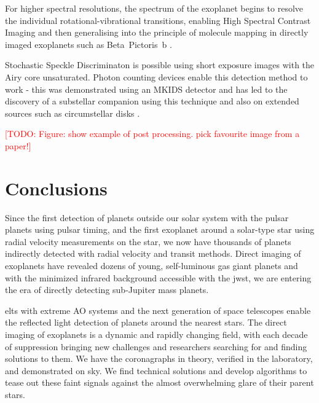 \documentclass[letterpaper]{ar-1col}
\newcommand{\todo}[1]{\textcolor{red}{[TODO: #1]}}
\begin{document}
For higher spectral resolutions, the spectrum of the exoplanet begins to resolve the individual rotational-vibrational transitions, enabling High Spectral Contrast Imaging \citep[including the detection of HD~209458b ][]{Snellen10} and then generalising into the principle of molecule mapping in directly imaged exoplanets such as Beta~Pictoris~b \citep{Hoeijmakers18}.

Stochastic Speckle Discriminaton \citep[SSD; ][]{Gladysz09} is possible using short exposure images with the Airy core unsaturated.
%
Photon counting devices enable this detection method to work - this was demonstrated using an MKIDS detector and has led to the discovery of a substellar companion using this technique \citep{Steiger21} and also on extended sources such as circumstellar disks \citep{Steiger22}.


\todo{Figure: show example of post processing. pick favourite image from a paper!}

\section{Conclusions}

Since the first detection of planets outside our solar system with the pulsar planets \citep{Wolszczan92} using pulsar timing, and the first exoplanet around a solar-type star \citep[51 Peg b; ][]{Mayor95} using radial velocity measurements on the star, we now have thousands of planets indirectly detected with radial velocity and transit methods.
%
Direct imaging of exoplanets have revealed dozens of young, self-luminous gas giant planets \citep{Currie23,Chauvin24} and with the minimized infrared background accessible with the \ac{jwst}, we are entering the era of directly detecting sub-Jupiter mass planets.

\acp{elt} with extreme AO systems and the next generation of space telescopes enable the reflected light detection of planets around the nearest stars.
%
The direct imaging of exoplanets is a dynamic and rapidly changing field, with each decade of suppression bringing new challenges and researchers searching for and finding solutions to them.
%
We have the coronagraphs in theory, verified in the laboratory, and demonstrated on sky.
%
We find technical solutions and develop algorithms to tease out these faint signals against the almost overwhelming glare of their parent stars.
\end{document}
